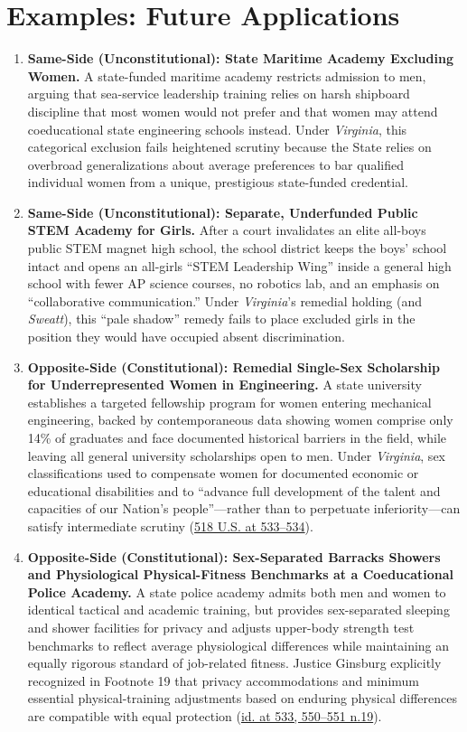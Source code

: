 \documentclass[12pt]{article}
\begin{document}
\section{Examples: Future Applications}
\begin{enumerate}
\item \textbf{Same-Side (Unconstitutional): State Maritime Academy Excluding Women.} A state-funded maritime academy restricts admission to men, arguing that sea-service leadership training relies on harsh shipboard discipline that most women would not prefer and that women may attend coeducational state engineering schools instead. Under \textit{Virginia}, this categorical exclusion fails heightened scrutiny because the State relies on overbroad generalizations about average preferences to bar qualified individual women from a unique, prestigious state-funded credential.
\item \textbf{Same-Side (Unconstitutional): Separate, Underfunded Public STEM Academy for Girls.} After a court invalidates an elite all-boys public STEM magnet high school, the school district keeps the boys' school intact and opens an all-girls ``STEM Leadership Wing'' inside a general high school with fewer AP science courses, no robotics lab, and an emphasis on ``collaborative communication.'' Under \textit{Virginia}'s remedial holding (and \textit{Sweatt}), this ``pale shadow'' remedy fails to place excluded girls in the position they would have occupied absent discrimination.
\item \textbf{Opposite-Side (Constitutional): Remedial Single-Sex Scholarship for Underrepresented Women in Engineering.} A state university establishes a targeted fellowship program for women entering mechanical engineering, backed by contemporaneous data showing women comprise only 14\% of graduates and face documented historical barriers in the field, while leaving all general university scholarships open to men. Under \textit{Virginia}, sex classifications used to compensate women for documented economic or educational disabilities and to ``advance full development of the talent and capacities of our Nation's people''---rather than to perpetuate inferiority---can satisfy intermediate scrutiny (\href{https://supreme.justia.com/cases/federal/us/518/515/}{518 U.S. at 533--534}).
\item \textbf{Opposite-Side (Constitutional): Sex-Separated Barracks Showers and Physiological Physical-Fitness Benchmarks at a Coeducational Police Academy.} A state police academy admits both men and women to identical tactical and academic training, but provides sex-separated sleeping and shower facilities for privacy and adjusts upper-body strength test benchmarks to reflect average physiological differences while maintaining an equally rigorous standard of job-related fitness. Justice Ginsburg explicitly recognized in Footnote 19 that privacy accommodations and minimum essential physical-training adjustments based on enduring physical differences are compatible with equal protection (\href{https://supreme.justia.com/cases/federal/us/518/515/}{id. at 533, 550--551 n.19}).

\end{enumerate}
\end{document}
